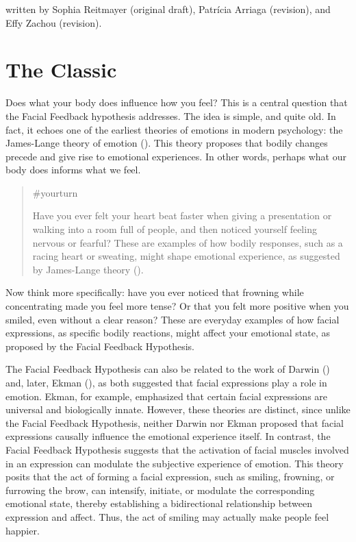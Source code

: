 \documentclass[
  letterpaper,
]{book}
\begin{document}
{written by Sophia Reitmayer (original draft), Patrícia Arriaga
(revision), and Effy Zachou (revision).}

\section{The Classic}\label{the-classic-20}

Does what your body does influence how you feel? This is a central
question that the Facial Feedback hypothesis addresses. The idea is
simple, and quite old. In fact, it echoes one of the earliest theories
of emotions in modern psychology: the James-Lange theory of emotion
(). This theory proposes that
bodily changes precede and give rise to emotional experiences. In other
words, perhaps what our body does informs what we feel.

\begin{quote}
{\#yourturn}

Have you ever felt your heart beat faster when giving a presentation or
walking into a room full of people, and then noticed yourself feeling
nervous or fearful? These are examples of how bodily responses, such as
a racing heart or sweating, might shape emotional experience, as
suggested by James-Lange theory ().
\end{quote}

Now think more specifically: have you ever noticed that frowning while
concentrating made you feel more tense? Or that you felt more positive
when you smiled, even without a clear reason? These are everyday
examples of how facial expressions, as specific bodily reactions, might
affect your emotional state, as proposed by the Facial Feedback
Hypothesis.

The Facial Feedback Hypothesis can also be related to the work of Darwin
() and, later, Ekman
(), as both suggested that
facial expressions play a role in emotion. Ekman, for example,
emphasized that certain facial expressions are universal and
biologically innate. However, these theories are distinct, since unlike
the Facial Feedback Hypothesis, neither Darwin nor Ekman proposed that
facial expressions causally influence the emotional experience itself.
In contrast, the Facial Feedback Hypothesis suggests that the activation
of facial muscles involved in an expression can modulate the subjective
experience of emotion. This theory posits that the act of forming a
facial expression, such as smiling, frowning, or furrowing the brow, can
intensify, initiate, or modulate the corresponding emotional state,
thereby establishing a bidirectional relationship between expression and
affect. Thus, the act of smiling may actually make people feel happier.
\end{document}
